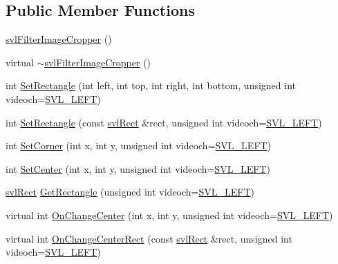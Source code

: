 \subsection*{Public Member Functions}
\begin{DoxyCompactItemize}
\item 
\hyperlink{classsvl_filter_image_cropper_a6dd807a3fbbe812f87378965fe3dd957}{svl\+Filter\+Image\+Cropper} ()
\item 
virtual \hyperlink{classsvl_filter_image_cropper_a37e10afabb4b758c7e0c91ac7b90fe49}{$\sim$svl\+Filter\+Image\+Cropper} ()
\item 
int \hyperlink{classsvl_filter_image_cropper_af00bdbf2b6638453aeeefa41b58bdba1}{Set\+Rectangle} (int left, int top, int right, int bottom, unsigned int videoch=\hyperlink{svl_definitions_8h_ab9fec7615f19c8df2919eebcab0b187f}{S\+V\+L\+\_\+\+L\+E\+F\+T})
\item 
int \hyperlink{classsvl_filter_image_cropper_af26e9acc8c27b2835c0e28cc4dee4278}{Set\+Rectangle} (const \hyperlink{structsvl_rect}{svl\+Rect} \&rect, unsigned int videoch=\hyperlink{svl_definitions_8h_ab9fec7615f19c8df2919eebcab0b187f}{S\+V\+L\+\_\+\+L\+E\+F\+T})
\item 
int \hyperlink{classsvl_filter_image_cropper_a05b129a4e6aca2c476e02cf7ca94eaca}{Set\+Corner} (int x, int y, unsigned int videoch=\hyperlink{svl_definitions_8h_ab9fec7615f19c8df2919eebcab0b187f}{S\+V\+L\+\_\+\+L\+E\+F\+T})
\item 
int \hyperlink{classsvl_filter_image_cropper_a18b59d8470e71f016ec46fbc1e688ecc}{Set\+Center} (int x, int y, unsigned int videoch=\hyperlink{svl_definitions_8h_ab9fec7615f19c8df2919eebcab0b187f}{S\+V\+L\+\_\+\+L\+E\+F\+T})
\item 
\hyperlink{structsvl_rect}{svl\+Rect} \hyperlink{classsvl_filter_image_cropper_a208c25e5185018761ba7412eaa67a876}{Get\+Rectangle} (unsigned int videoch=\hyperlink{svl_definitions_8h_ab9fec7615f19c8df2919eebcab0b187f}{S\+V\+L\+\_\+\+L\+E\+F\+T})
\item 
virtual int \hyperlink{classsvl_filter_image_cropper_a77e4d5b382b25768300adb7d4ed139d7}{On\+Change\+Center} (int x, int y, unsigned int videoch=\hyperlink{svl_definitions_8h_ab9fec7615f19c8df2919eebcab0b187f}{S\+V\+L\+\_\+\+L\+E\+F\+T})
\item 
virtual int \hyperlink{classsvl_filter_image_cropper_a637afb41415c13dfe6c5a8fdebc7656f}{On\+Change\+Center\+Rect} (const \hyperlink{structsvl_rect}{svl\+Rect} \&rect, unsigned int videoch=\hyperlink{svl_definitions_8h_ab9fec7615f19c8df2919eebcab0b187f}{S\+V\+L\+\_\+\+L\+E\+F\+T})
\end{DoxyCompactItemize}
